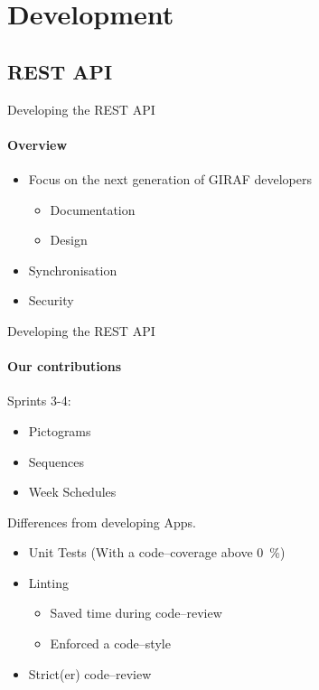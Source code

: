 \section{Development}
    \subsection{REST API}
        \begin{frame}[t]{Developing the REST API}\framesubtitle{Overview}
            \begin{itemize}
                \item Focus on the next generation of GIRAF developers
                \begin{itemize}
                    \item Documentation
                    \item Design
                \end{itemize}
                \item Synchronisation
                \item Security
            \end{itemize}
        \end{frame}

        \begin{frame}[t]{Developing the REST API}\framesubtitle{Our contributions}
            Sprints 3-4:
            \begin{itemize}
                \item Pictograms
                \item Sequences
                \item Week Schedules
            \end{itemize}
            \bigskip
            Differences from developing Apps.
            \begin{itemize}
                \item Unit Tests (With a code--coverage above 0~\%)
                \item Linting
                \begin{itemize}
                    \item Saved time during code--review
                    \item Enforced a code--style
                \end{itemize}
                \item Strict(er) code--review
            \end{itemize}
        \end{frame}

